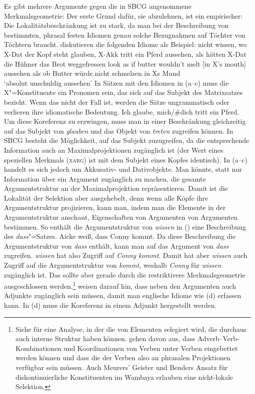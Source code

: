 Es gibt mehrere Argumente gegen die in SBCG angenommene Merkmalsgeometrie: Der erste Grund dafür,
sie abzulehnen, ist ein empirischer: Die Lokalitätsbeschränkung ist zu stark, da man bei der
Beschreibung von bestimmten, phrasal festen Idiomen genau solche Bezugnahmen auf Töchter von
Töchtern braucht.  diskutieren die folgenden Idiome als Beispiel:
\eal
\ex nicht wissen, wo X-Dat der Kopf steht
\ex\label{mich-tritt-ein-Pferd}
glauben, X-Akk tritt ein Pferd
\ex aussehen, als hätten X-Dat die Hühner das Brot weggefressen
\ex
\gll look as if butter wouldn't melt [in X's mouth]\\
     aussehen als ob Butter würde.nicht schmelzen \hphantom{[}in Xs Mund\\
\glt `absolut unschuldig aussehen'
\zl
In Sätzen mit den Idiomen in (a--c) muss die X"=Konstituente ein Pronomen sein, das sich auf
das Subjekt des Matrixsatzes bezieht. Wenn das nicht der Fall ist, werden die Sätze ungrammatisch
oder verlieren ihre idiomatische Bedeutung.
\ea
Ich glaube, mich/\#dich tritt ein Pferd.
\z
Um diese Koreferenz zu erzwingen, muss man in einer Beschränkung gleichzeitig auf das Subjekt von
\emph{glauben} und das Objekt von \emph{treten} zugreifen können. In SBCG besteht die Möglichkeit,
auf das Subjekt zuzugreifen, da die entsprechende Information auch an Maximalprojektionen zugänglich
ist (der Wert eines speziellen Merkmals (\textsc{xarg}) ist mit dem Subjekt eines Kopfes identisch). In
(a--c) handelt es sich jedoch um Akkusativ- und Dativobjekte. Man könnte, statt nur
Information über ein Argument zugänglich zu machen, die gesamte Argumentstruktur an der
Maximalprojektion repräsentieren. Damit ist die Lokalität der Selektion aber ausgehebelt, denn wenn
alle Köpfe ihre Argumentstruktur projizieren, kann man, indem man die Elemente in der
Argumentstruktur anschaut, Eigenschaften von Argumenten von Argumenten bestimmen. So enthält \zb die
Argumentstruktur von \emph{wissen} in () eine Beschreibung des \emph{dass}"=Satzes.
\ea
Aicke weiß, dass Conny kommt.
\z
Da diese Beschreibung die Argumentstruktur von \emph{dass} enthält, kann man auf das Argument von
\emph{dass} zugreifen. \emph{wissen} hat also Zugriff auf \emph{Conny kommt}. Damit hat aber
\emph{wissen} auch Zugriff auf die Argumentstruktur von \emph{kommt}, weshalb \emph{Conny} für
\emph{wissen} zugänglich ist. Das sollte aber gerade durch die restriktivere Merkmalsgeometrie
ausgeschlossen werden.\footnote{%
  Siehe \citet*[15--16]{AGS1998a} für eine Analyse, in der die \argstl von Elementen selegiert wird,
  die durchaus auch interne Struktur haben können. \citet[328,332]{AG2000a} gehen davon aus, dass
  Adverb--Verb-Kombinationen und Koordinationen von Verben unter Verben eingebettet werden können
  und dass die \argstl der Verben also an phrasalen Projektionen verfügbar sein müssen. Auch
  Meurers' Geister \citeyearpar{Meurers99b} und Benders Ansatz \citeyearpar{Bender2008a} für
  diskontinuierliche Konstituenten im Wambaya erlauben eine nicht-lokale Selektion.%
} \citeauthor{RS2009a} weisen darauf hin, dass neben den Argumenten auch Adjunkte
zugänglich sein müssen, damit man englische Idiome wie (d) erfassen kann. In (d)
muss die Koreferenz in einem Adjunkt hergestellt werden.

